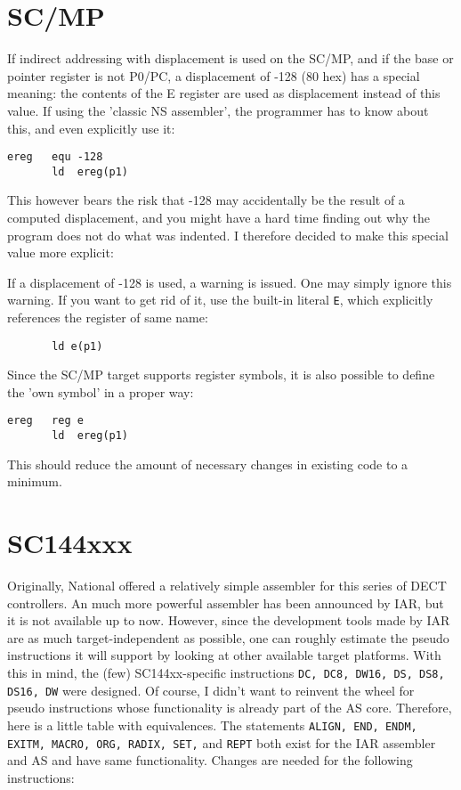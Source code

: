 \documentclass[12pt,twoside]{report}
\newcommand{\tty}[1]{{\tt #1}}
\newcommand{\asname}{{AS}}
\begin{document}

\section{SC/MP}

If indirect addressing with displacement is used on the SC/MP, and
if the base or pointer register is not P0/PC, a displacement of -128
(80 hex) has a special meaning: the contents of the E register are
used as displacement instead of this value.  If using the 'classic NS
assembler', the programmer has to know about this, and even explicitly
use it:
\begin{verbatim}
ereg   equ -128
       ld  ereg(p1)
\end{verbatim}
This however bears the risk that -128 may accidentally be the result of
a computed displacement, and you might have a hard time finding out
why the program does not do what was indented. I therefore decided to
make this special value more explicit:

If a displacement of -128 is used, a warning is issued.  One may
simply ignore this warning.  If you want to get rid of it, use
the built-in literal \verb!E!, which explicitly references the
register of same name:
\begin{verbatim}
       ld e(p1)
\end{verbatim} 
Since the SC/MP target supports register symbols, it is also possible
to define the 'own symbol' in a proper way:
\begin{verbatim}
ereg   reg e
       ld  ereg(p1)
\end{verbatim}
This should reduce the amount of necessary changes in existing code
to a minimum.


\section{SC144xxx}
\label{SC144xxspec}

Originally, National offered a relatively simple assembler for this series
of DECT controllers.  An much more powerful assembler has been announced
by IAR, but it is not available up to now.  However, since the development
tools made by IAR are as much target-independent as possible, one can
roughly estimate the pseudo instructions it will support by looking at
other available target platforms.  With this in mind, the (few)
SC144xx-specific instructions {\tt DC, DC8, DW16, DS, DS8, DS16, DW} were
designed.  Of course, I didn't want to reinvent the wheel for pseudo
instructions whose functionality is already part of the \asname{} core.
Therefore, here is a little table with equivalences.  The statements
\tty{ALIGN, END, ENDM, EXITM, MACRO, ORG, RADIX, SET,} and \tty{REPT} both
exist for the IAR assembler and \asname{} and have same functionality.  Changes
are needed for the following instructions:
\end{document}
